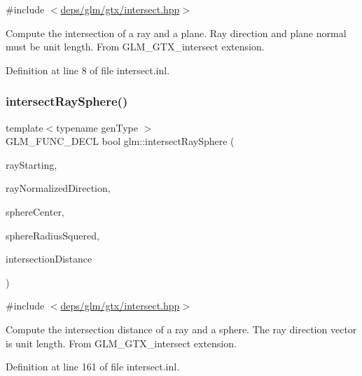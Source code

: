 {\ttfamily \#include $<$\hyperlink{intersect_8hpp}{deps/glm/gtx/intersect.\+hpp}$>$}

Compute the intersection of a ray and a plane. Ray direction and plane normal must be unit length. From G\+L\+M\+\_\+\+G\+T\+X\+\_\+intersect extension. 

Definition at line 8 of file intersect.\+inl.

\mbox{\label{group__gtx__intersect_gac88f8cd84c4bcb5b947d56acbbcfa56e}} 
\subsubsection{\texorpdfstring{intersect\+Ray\+Sphere()}{intersectRaySphere()}\hspace{0.1cm}{\footnotesize\ttfamily [1/2]}}
{\footnotesize\ttfamily template$<$typename gen\+Type $>$ \\
G\+L\+M\+\_\+\+F\+U\+N\+C\+\_\+\+D\+E\+CL bool glm\+::intersect\+Ray\+Sphere (\begin{DoxyParamCaption}\item[{gen\+Type const \&}]{ray\+Starting,  }\item[{gen\+Type const \&}]{ray\+Normalized\+Direction,  }\item[{gen\+Type const \&}]{sphere\+Center,  }\item[{typename gen\+Type\+::value\+\_\+type const}]{sphere\+Radius\+Squered,  }\item[{typename gen\+Type\+::value\+\_\+type \&}]{intersection\+Distance }\end{DoxyParamCaption})}



{\ttfamily \#include $<$\hyperlink{intersect_8hpp}{deps/glm/gtx/intersect.\+hpp}$>$}

Compute the intersection distance of a ray and a sphere. The ray direction vector is unit length. From G\+L\+M\+\_\+\+G\+T\+X\+\_\+intersect extension. 

Definition at line 161 of file intersect.\+inl.

